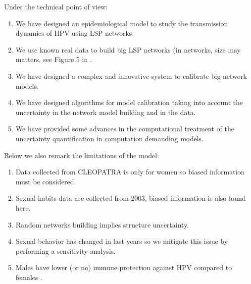 Under the technical point of view:
\begin{enumerate}
	\item We have designed an epidemiological model to study the transmission dynamics of HPV using LSP networks.
	\item We use known real data to build big LSP networks (in networks, size may matters, see Figure 5 in \cite{villanueva2013epidemic}.
	\item We have designed a complex and innovative system to calibrate big network models.
	\item We have designed algorithms for model calibration taking into account the uncertainty in the network model building and in the data. 
	\item We have provided some advances in the computational treatment of the uncertainty quantification in computation demanding models.
\end{enumerate}

Below we also remark the limitations of the model:
\begin{enumerate}
	\item Data collected from CLEOPATRA is only for women so biased information must be considered.
	\item Sexual habits data are collected from 2003, biased information is also found here.
	\item Random networks building implies structure uncertainty.
	\item Sexual behavior has changed in last years so we mitigate this issue by performing a sensitivity analysis.
	\item Males have lower (or no) immune protection against HPV compared to females \cite{chandra2013sexual}.
\end{enumerate}
